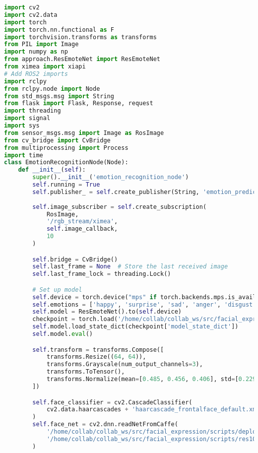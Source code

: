 \begin{lstlisting}[language=Python, caption={Python skript pre rozpoznávanie emócií}, label={lst:emotion-recognition}]
import cv2
import cv2.data
import torch
import torch.nn.functional as F
import torchvision.transforms as transforms
from PIL import Image
import numpy as np
from approach.ResEmoteNet import ResEmoteNet
from ximea import xiapi
# Add ROS2 imports
import rclpy
from rclpy.node import Node
from std_msgs.msg import String
from flask import Flask, Response, request
import threading
import signal
import sys
from sensor_msgs.msg import Image as RosImage
from cv_bridge import CvBridge
from multiprocessing import Process
import time
class EmotionRecognitionNode(Node):
    def __init__(self):
        super().__init__('emotion_recognition_node')
        self.running = True
        self.publisher_ = self.create_publisher(String, 'emotion_prediction', 10)
        
        self.image_subscriber = self.create_subscription(
            RosImage,
            '/rgb_stream/ximea',
            self.image_callback,
            10
        )

        self.bridge = CvBridge()
        self.last_frame = None  # Store the last received image
        self.last_frame_lock = threading.Lock()

        # Set up model
        self.device = torch.device("mps" if torch.backends.mps.is_available() else "cpu")
        self.emotions = ['happy', 'surprise', 'sad', 'anger', 'disgust', 'fear', 'neutral']
        self.model = ResEmoteNet().to(self.device)
        checkpoint = torch.load('/home/collab/collab_ws/src/facial_expression/scripts/rafdb_model.pth', weights_only=True)
        self.model.load_state_dict(checkpoint['model_state_dict'])
        self.model.eval()

        self.transform = transforms.Compose([
            transforms.Resize((64, 64)),
            transforms.Grayscale(num_output_channels=3),
            transforms.ToTensor(),
            transforms.Normalize(mean=[0.485, 0.456, 0.406], std=[0.229, 0.224, 0.225]),
        ])

        self.face_classifier = cv2.CascadeClassifier(
            cv2.data.haarcascades + 'haarcascade_frontalface_default.xml'
        )
        self.face_net = cv2.dnn.readNetFromCaffe(
            '/home/collab/collab_ws/src/facial_expression/scripts/deploy.prototxt',
            '/home/collab/collab_ws/src/facial_expression/scripts/res10_300x300_ssd_iter_140000.caffemodel'
        )


\end{lstlisting}
